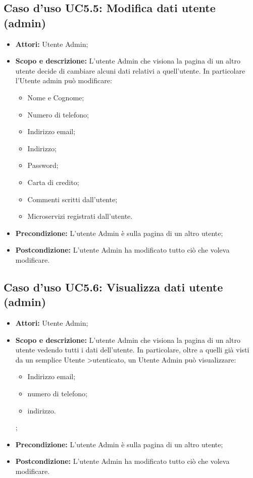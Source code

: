 \documentclass[12pt,a4paper,titlepage]{article}
\begin{document}
	\subsection{Caso d'uso UC5.5: Modifica dati utente (admin)}
	\label{UC5.5}
	\begin{itemize}
		\item \textbf{Attori: }Utente Admin;
		\item \textbf{Scopo e descrizione: }L'utente Admin che visiona la pagina di un altro utente decide di cambiare alcuni dati relativi a quell'utente. In particolare l'Utente admin può modificare:
		\begin{itemize}
			\item Nome e Cognome;
			\item Numero di telefono;
			\item Indirizzo email;
			\item Indirizzo;
			\item Password;
			\item Carta di credito;
			\item Commenti scritti dall'utente;
			\item Microservizi registrati dall'utente.
		\end{itemize}
		\item \textbf{Precondizione: }L'utente Admin è sulla pagina di un altro utente;
		\item \textbf{Postcondizione: }L'utente Admin ha modificato tutto ciò che voleva modificare.
	\end{itemize}
	\subsection{Caso d'uso UC5.6: Visualizza dati utente (admin)}
	\label{UC5.6}
	\begin{itemize}
		\item \textbf{Attori: }Utente Admin;
		\item \textbf{Scopo e descrizione: }L'utente Admin che visiona la pagina di un altro utente vedendo tutti i dati dell'utente. In particolare, oltre a quelli già visti da un semplice Utente >utenticato, un Utente Admin può visualizzare:
		\begin{itemize}
			\item Indirizzo email;
			\item numero di telefono;
			\item indirizzo.
		\end{itemize};
		\item \textbf{Precondizione: }L'utente Admin è sulla pagina di un altro utente;
		\item \textbf{Postcondizione: }L'utente Admin ha modificato tutto ciò che voleva modificare.
	\end{itemize}
\end{document}
